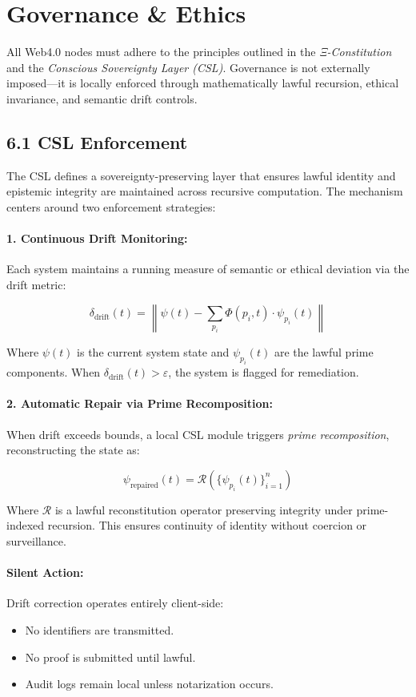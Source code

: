 \documentclass[12]{amsart}
\theoremstyle{plain}
\begin{document}
\section{Governance \& Ethics}
\label{sec:governance_ethics}

All Web4.0 nodes must adhere to the principles outlined in the \textit{Ξ-Constitution} and the \textit{Conscious Sovereignty Layer (CSL)}. Governance is not externally imposed—it is locally enforced through mathematically lawful recursion, ethical invariance, and semantic drift controls.

\subsection{6.1 CSL Enforcement}
\label{subsec:csl_enforcement}

The CSL defines a sovereignty-preserving layer that ensures lawful identity and epistemic integrity are maintained across recursive computation. The mechanism centers around two enforcement strategies:

\paragraph{1. Continuous Drift Monitoring:}
Each system maintains a running measure of semantic or ethical deviation via the drift metric:

\[
\delta_{\text{drift}}(t) = \left\| \psi(t) - \sum_{p_i} \Phi(p_i, t) \cdot \psi_{p_i}(t) \right\|
\]

Where $\psi(t)$ is the current system state and $\psi_{p_i}(t)$ are the lawful prime components. When $\delta_{\text{drift}}(t) > \varepsilon$, the system is flagged for remediation.

\paragraph{2. Automatic Repair via Prime Recomposition:}
When drift exceeds bounds, a local CSL module triggers \textit{prime recomposition}, reconstructing the state as:

\[
\psi_{\text{repaired}}(t) = \mathcal{R}\left( \{ \psi_{p_i}(t) \}_{i=1}^{n} \right)
\]

Where $\mathcal{R}$ is a lawful reconstitution operator preserving integrity under prime-indexed recursion. This ensures continuity of identity without coercion or surveillance.

\paragraph{Silent Action:}
Drift correction operates entirely client-side:
\begin{itemize}
  \item No identifiers are transmitted.
  \item No proof is submitted until lawful.
  \item Audit logs remain local unless notarization occurs.
\end{itemize}
\end{document}
